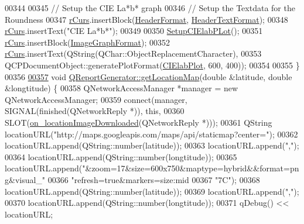 \begin{DoxyCode}
{00344 
00345   \textcolor{comment}{// Setup the CIE La*b* graph}
00346   \textcolor{comment}{// Setup the Textdata for the Roundness}
00347   \hyperlink{class_q_report_generator_af189d3779d26af513e311eea89a78a28}{rCurs}.insertBlock(\hyperlink{class_q_report_generator_af2b45261507663b54e80f4053d25bc4b}{HeaderFormat}, \hyperlink{class_q_report_generator_a8be687c8a427e341fa1c7f9addc96e99}{HeaderTextFormat});
00348   \hyperlink{class_q_report_generator_af189d3779d26af513e311eea89a78a28}{rCurs}.insertText(\textcolor{stringliteral}{"CIE La*b*"});
00349 
00350   \hyperlink{class_q_report_generator_a828ae557a03162a08d13f94f2d1888f4}{SetupCIElabPLot}();
00351   \hyperlink{class_q_report_generator_af189d3779d26af513e311eea89a78a28}{rCurs}.insertBlock(\hyperlink{class_q_report_generator_a19451127788bb6c68907b312a0a8b750}{ImageGraphFormat});
00352   \hyperlink{class_q_report_generator_af189d3779d26af513e311eea89a78a28}{rCurs}.insertText(QString(QChar::ObjectReplacementCharacter),
00353                    QCPDocumentObject::generatePlotFormat(\hyperlink{class_q_report_generator_a1a727308ea8cb98523a308d10da70b39}{CIElabPlot}, 600, 400));
00354 
00355 \}
00356 
\hypertarget{qreportgenerator_8cpp_source_l00357}{}\hyperlink{class_q_report_generator_ad588cf415e3d3a571fbd2fa7f9f30612}{00357} \textcolor{keywordtype}{void} \hyperlink{class_q_report_generator_ad588cf415e3d3a571fbd2fa7f9f30612}{QReportGenerator::getLocationMap}(\textcolor{keywordtype}{double} &latitude, \textcolor{keywordtype}{double} &longtitude)
       \{
00358   QNetworkAccessManager *manager = \textcolor{keyword}{new} QNetworkAccessManager;
00359   connect(manager, SIGNAL(finished(QNetworkReply *)), \textcolor{keyword}{this},
00360           SLOT(\hyperlink{class_q_report_generator_a15c7c37fe5a9f178ae29bc1484aeaad9}{on\_locationImageDownloaded}(QNetworkReply *)));
00361   QString locationURL(\textcolor{stringliteral}{"http://maps.googleapis.com/maps/api/staticmap?center="});
00362   locationURL.append(QString::number(latitude));
00363   locationURL.append(\textcolor{stringliteral}{","});
00364   locationURL.append(QString::number(longtitude));
00365   locationURL.append(\textcolor{stringliteral}{"&zoom=17&size=600x750&maptype=hybrid&&format=png&visual\_"}
00366                      \textcolor{stringliteral}{"refresh=true&markers=size:mid%
00367                      \textcolor{stringliteral}{"7C"});
00368   locationURL.append(QString::number(latitude));
00369   locationURL.append(\textcolor{stringliteral}{","});
00370   locationURL.append(QString::number(longtitude));
00371   qDebug() << locationURL;
}}
\end{DoxyCode}
